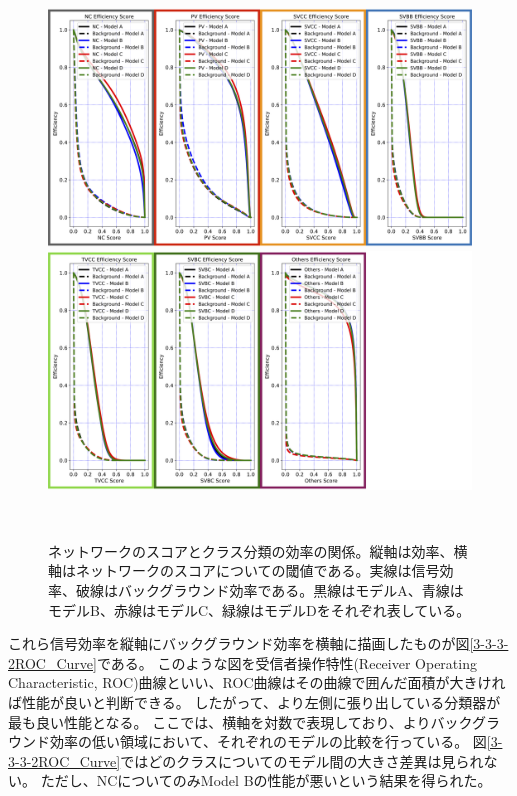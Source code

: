 \begin{figure}[htbp]
 \centering
   \begin{minipage}{1.0\textwidth}
    \centering
    \includegraphics[width=1.0\textwidth, clip]{Figure/3Networks/3-3-3-2Efficiency_Curve_1.png}
   \end{minipage}

   \begin{minipage}{1.0\textwidth}
   \centering
    \includegraphics[width=1.0\textwidth, clip]{Figure/3Networks/3-3-3-2Efficiency_Curve_2.png}
   \end{minipage}
  \caption[ネットワークのスコアとクラス分類の効率の関係]{ネットワークのスコアとクラス分類の効率の関係。縦軸は効率、横軸はネットワークのスコアについての閾値である。実線は信号効率、破線はバックグラウンド効率である。黒線はモデルA、青線はモデルB、赤線はモデルC、緑線はモデルDをそれぞれ表している。}
  \label{3-3-3-2Efficiency_Curve}
\end{figure}

これら信号効率を縦軸にバックグラウンド効率を横軸に描画したものが図\ref{3-3-3-2ROC_Curve}である。
このような図を受信者操作特性(Receiver Operating Characteristic, ROC)曲線といい、ROC曲線はその曲線で囲んだ面積が大きければ性能が良いと判断できる。
したがって、より左側に張り出している分類器が最も良い性能となる。
ここでは、横軸を対数で表現しており、よりバックグラウンド効率の低い領域において、それぞれのモデルの比較を行っている。
図\ref{3-3-3-2ROC_Curve}ではどのクラスについてのモデル間の大きさ差異は見られない。
ただし、NCについてのみModel Bの性能が悪いという結果を得られた。

